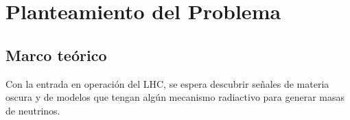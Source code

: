 \documentclass[11pt]{article}
\begin{document}














\bigskip

\section{ Planteamiento del Problema }

\subsection{Marco teórico}

Con la entrada en operación del LHC, se espera descubrir señales de materia oscura y de modelos que tengan algún mecanismo radiactivo para generar masas de neutrinos.
\end{document}
